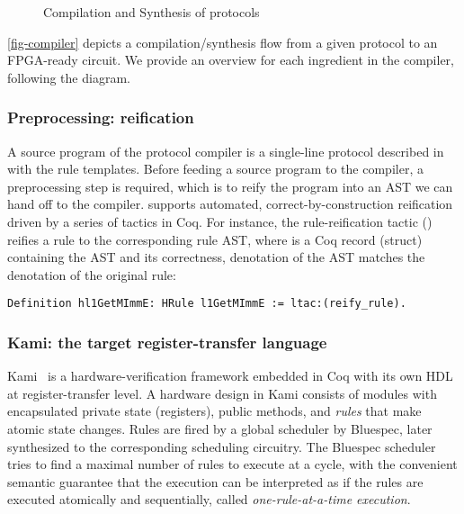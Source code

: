 \begin{figure}[t]
  \caption{Compilation and Synthesis of \hemiola{} protocols}
  \label{fig-compiler}
\end{figure}

\autoref{fig-compiler} depicts a compilation/synthesis flow from a given \hemiola{} protocol to an FPGA-ready circuit.
We provide an overview for each ingredient in the compiler, following the diagram.

\subsubsection{Preprocessing: reification}

A source program of the protocol compiler is a single-line protocol described in \hemiola{} with the rule templates.
Before feeding a \hemiola{} source program to the compiler, a preprocessing step is required, which is to reify the program into an AST we can hand off to the compiler.
\hemiola{} supports automated, correct-by-construction reification driven by a series of tactics in Coq.
For instance, the rule-reification tactic () reifies a \hemiola{} rule to the corresponding rule AST, where  is a Coq record (struct) containing the AST and its correctness, \ie{} denotation of the AST matches the denotation of the original rule:
\begin{lstlisting}[numbers=none, frame=none]
    Definition hl1GetMImmE: HRule l1GetMImmE := ltac:(reify_rule).
\end{lstlisting}

\subsubsection{Kami: the target register-transfer language}

Kami~\cite{kami} is a hardware-verification framework embedded in Coq with its own HDL at register-transfer level.
A hardware design in Kami consists of modules with encapsulated private state (registers), public methods, and \emph{rules} that make atomic state changes.
Rules are fired by a global scheduler by Bluespec, later synthesized to the corresponding scheduling circuitry.
The Bluespec scheduler tries to find a maximal number of rules to execute at a cycle, with the convenient semantic guarantee that the execution can be interpreted as if the rules are executed atomically and sequentially, called \emph{one-rule-at-a-time execution}.

